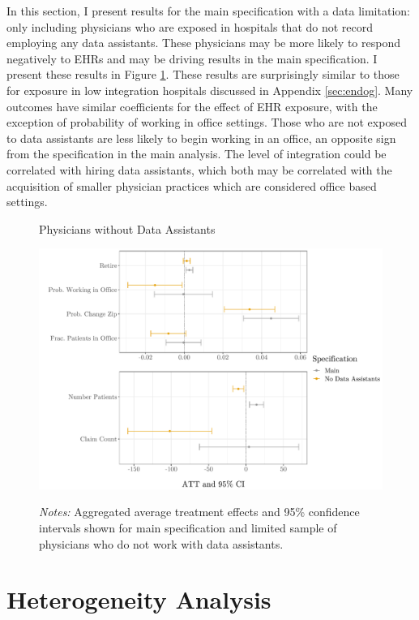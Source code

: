 \documentclass[11pt]{article}
\begin{document}
In this section, I present results for the main specification with a data limitation: only including physicians who are exposed in hospitals that do not record employing any data assistants. These physicians may be more likely to respond negatively to EHRs and may be driving results in the main specification. I present these results in Figure \ref{fig:DA}. These results are surprisingly similar to those for exposure in low integration hospitals discussed in Appendix \ref{sec:endog}. Many outcomes have similar coefficients for the effect of EHR exposure, with the exception of probability of working in office settings. Those who are not exposed to data assistants are less likely to begin working in an office, an opposite sign from the specification in the main analysis. The level of integration could be correlated with hiring data assistants, which both may be correlated with the acquisition of smaller physician practices which are considered office based settings.

\begin{figure}[ht]
    \centering
    \captionsetup{width=.57\linewidth}
    \caption{Physicians without Data Assistants}
    \includegraphics[scale=.57]{Objects/DA_graph.pdf}
    \label{fig:DA}
    \vspace{2mm}
    \caption*{\footnotesize{\textit{Notes:} Aggregated average treatment effects and 95\% confidence intervals shown for main specification and limited sample of physicians who do not work with data assistants.}}
\end{figure}



\section{Heterogeneity Analysis}
\end{document}
